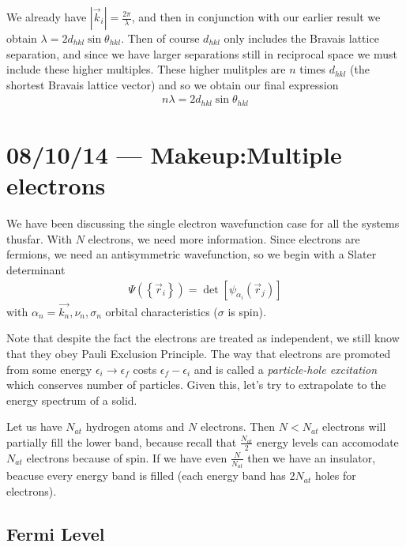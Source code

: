 \documentclass[10pt]{report}
\newcommand{\abs}[1]{\left|#1\right|}
\begin{document}
\begin{enumerate}[1.]
        We already have $\abs{\vec{k}_i} = \frac{2\pi}{\lambda}$, and then in conjunction with our earlier result we obtain $\lambda = 2d_{hkl}\sin\theta_{hkl}$. Then of course $d_{hkl}$ only includes the Bravais lattice separation, and since we have larger separations still in reciprocal space we must include these higher multiples. These higher mulitples are $n$ times $d_{hkl}$ (the shortest Bravais lattice vector) and so we obtain our final expression
        \begin{align}
            n\lambda = 2d_{hkl}\sin\theta_{hkl}
        \end{align}
\end{enumerate}

\chapter{08/10/14 --- Makeup:Multiple electrons}

We have been discussing the single electron wavefunction case for all the systems thusfar. With $N$ electrons, we need more information. Since electrons are fermions, we need an antisymmetric wavefunction, so we begin with a Slater determinant
\begin{align}
    \Psi\left( \left\{ \vec{r}_i \right\} \right) = \det\left[ \psi_{\alpha_i}\left( \vec{r}_j \right) \right]
\end{align}
with $\alpha_n = \vec{k_n},\nu_n, \sigma_n$ orbital characteristics ($\sigma$ is spin).

Note that despite the fact the electrons are treated as independent, we still know that they obey Pauli Exclusion Principle. The way that electrons are promoted from some energy $\epsilon_i \to \epsilon_f$ costs $\epsilon_f - \epsilon_i$ and is called a \emph{particle-hole excitation} which conserves number of particles. Given this, let's try to extrapolate to the energy spectrum of a solid.

Let us have $N_{at}$ hydrogen atoms and $N$ electrons. Then $N < N_{at}$ electrons will partially fill the lower band, because recall that $\frac{N_{at}}{2}$ energy levels can accomodate $N_{at}$ electrons because of spin. If we have even $\frac{N}{N_{at}}$ then we have an insulator, beacuse every energy band is filled (each energy band has $2N_{at}$ holes for electrons).

\section{Fermi Level}
\end{document}
